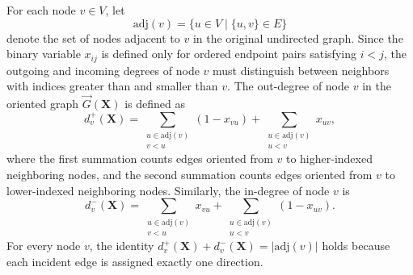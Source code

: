 \documentclass[twocolumn,a4paper]{article} %
\begin{document}
For each node \(v\in V\), let
\begin{equation}
    \mathrm{adj}(v)=\{u\in V\mid \{u,v\}\in E\}
\end{equation}
denote the set of nodes adjacent to \(v\) in the original undirected graph. Since the binary variable \(x_{ij}\) is defined only for ordered endpoint pairs satisfying \(i<j\), the outgoing and incoming degrees of node \(v\) must distinguish between neighbors with indices greater than and smaller than \(v\). The out-degree of node \(v\) in the oriented graph \(\vec{G}(\mathbf{X})\) is defined as
\begin{equation}
    d_v^{+}(\mathbf{X})
    =
    \sum_{\substack{u\in \mathrm{adj}(v)\\v<u}}
    (1-x_{vu})
    +
    \sum_{\substack{u\in \mathrm{adj}(v)\\u<v}}
    x_{uv},
\end{equation}
where the first summation counts edges oriented from \(v\) to higher-indexed neighboring nodes, and the second summation counts edges oriented from \(v\) to lower-indexed neighboring nodes. Similarly, the in-degree of node \(v\) is
\begin{equation}
    d_v^{-}(\mathbf{X})
    =
    \sum_{\substack{u\in \mathrm{adj}(v)\\v<u}}
    x_{vu}
    +
    \sum_{\substack{u\in \mathrm{adj}(v)\\u<v}}
    (1-x_{uv}).
\end{equation}
For every node \(v\), the identity $d_v^{+}(\mathbf{X})+d_v^{-}(\mathbf{X})=|\mathrm{adj}(v)|$
holds because each incident edge is assigned exactly one direction.
\end{document}
